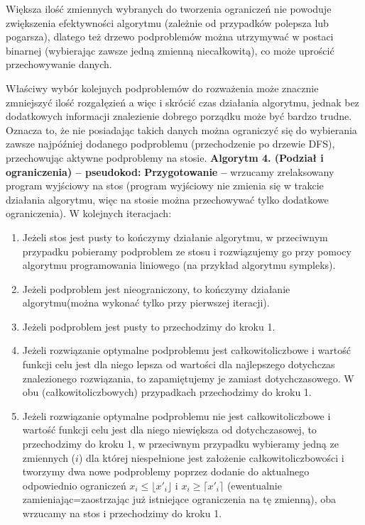 \documentclass[licencjacka]{pracamgr}
\begin{document}
Większa ilość zmiennych wybranych do tworzenia ograniczeń nie powoduje zwiększenia efektywności algorytmu (zależnie od przypadków polepsza lub pogarsza), dlatego też drzewo podproblemów
można utrzymywać w postaci binarnej (wybierając zawsze jedną zmienną niecałkowitą), co może uprościć przechowywanie danych.

Właściwy wybór kolejnych podproblemów do rozważenia może znacznie zmniejszyć ilość rozgałęzień a więc i skrócić czas działania algorytmu, jednak bez dodatkowych informacji znalezienie dobrego
porządku może być bardzo trudne. Oznacza to, że nie posiadając takich danych można ograniczyć się do wybierania zawsze najpóźniej dodanego podproblemu
(przechodzenie po drzewie DFS), przechowując aktywne podproblemy na stosie.\newline\newline
%
\textbf{Algorytm 4. (Podział i ograniczenia) -- pseudokod:}\newline\newline
%
\textbf{Przygotowanie --}
wrzucamy zrelaksowany program wyjściowy na stos (program wyjściowy nie zmienia się w trakcie działania algorytmu, więc na stosie można przechowywać tylko dodatkowe ograniczenia).\newline\newline
%
W kolejnych iteracjach:
\begin{enumerate}
\item Jeżeli stos jest pusty to kończymy działanie algorytmu, w przeciwnym przypadku
pobieramy podproblem ze stosu i rozwiązujemy go przy pomocy algorytmu programowania liniowego (na przykład algorytmu sympleks).
%
\item Jeżeli podproblem jest nieograniczony, to kończymy działanie algorytmu(można wykonać tylko przy pierwszej iteracji).
%
\item Jeżeli podproblem jest pusty to przechodzimy do kroku 1.
%
\item Jeżeli rozwiązanie optymalne podproblemu jest całkowitoliczbowe i wartość funkcji celu jest dla niego lepsza
od wartości dla najlepszego dotychczas znalezionego rozwiązania, to zapamiętujemy je zamiast dotychczasowego.
W obu (całkowitoliczbowych) przypadkach przechodzimy do kroku 1.
%
\item Jeżeli rozwiązanie optymalne podproblemu nie jest całkowitoliczbowe i wartość funkcji celu jest dla niego niewiększa od dotychczasowej, to przechodzimy do kroku 1, w przeciwnym przypadku
wybieramy jedną ze zmiennych ($i$) dla której niespełnione jest założenie całkowitoliczbowości i tworzymy dwa nowe podproblemy poprzez dodanie do aktualnego odpowiednio ograniczeń
$x_i\le\lfloor x'_i\rfloor$ i $x_i\ge\lceil x'_i\rceil$ (ewentualnie zamieniając=zaostrzając już istniejące ograniczenia na tę zmienną), oba wrzucamy na stos i przechodzimy do kroku 1.
\end{enumerate}
\end{document}
